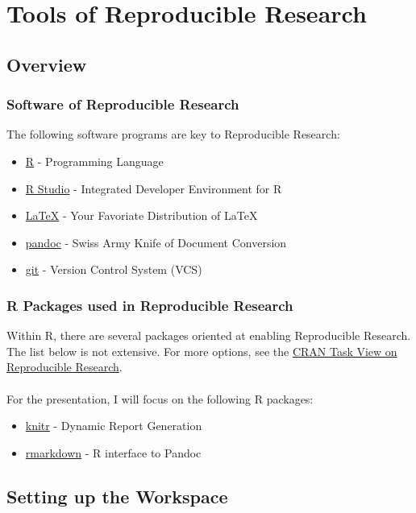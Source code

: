 \documentclass{beamer}\usepackage[]{graphicx}\usepackage[]{color}
\begin{document}
\section{Tools of Reproducible Research}
\subsection{Overview}
\begin{frame}
\frametitle{Software of Reproducible Research}
The following software programs are key to Reproducible Research:
\begin{itemize}
  \item \href{http://cran.r-project.org/}{R} - Programming Language
  \item \href{http://rstudio.com/ide/download}{R Studio} - Integrated Developer Environment for R 
  \item \href{http://latex-project.org/ftp.html}{\LaTeX} - Your Favoriate Distribution of \LaTeX
  \item \href{https://github.com/jgm/pandoc/releases}{pandoc} - Swiss Army Knife of Document Conversion
  \item \href{http://git-scm.com/downloads}{git} - Version Control System (VCS)
\end{itemize}
\end{frame}

\begin{frame}
\frametitle{R Packages used in Reproducible Research}
Within R, there are several packages oriented at enabling Reproducible Research. The list below is not extensive. For more options, see the \href{http://cran.r-project.org/web/views/ReproducibleResearch.html}{CRAN Task View on Reproducible Research}.
\\$ $\\
For the presentation, I will focus on the following R packages:
\begin{itemize}
  \item \href{http://yihui.name/knitr/demos}{knitr} - Dynamic Report Generation
  \item \href{http://cran.r-project.org/web/packages/rmarkdown/index.html}{rmarkdown} - R interface to Pandoc
\end{itemize}

\end{frame}

\subsection{Setting up the Workspace}
\end{document}
